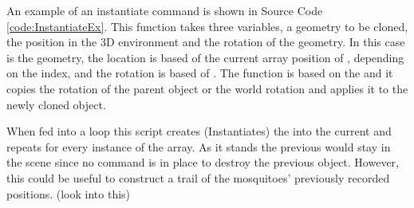 An example of an instantiate command is shown in Source Code \ref{code:InstantiateEx}. This function takes three variables, a geometry to be cloned, the position in the 3D environment and the rotation of the geometry. In  this case  is the geometry, the location is based of the current array position of , depending on the index, and the rotation is based of . The function  is based on the  and it copies the rotation of the parent object or the world rotation and applies it to the newly cloned object.

When fed into a loop this script creates (Instantiates) the  into the current  and repeats for every instance of the array. As it stands the previous  would stay in the scene since no command is in place to destroy the previous object. However, this could be useful to construct a trail of the mosquitoes' previously recorded positions. (look into this) 
